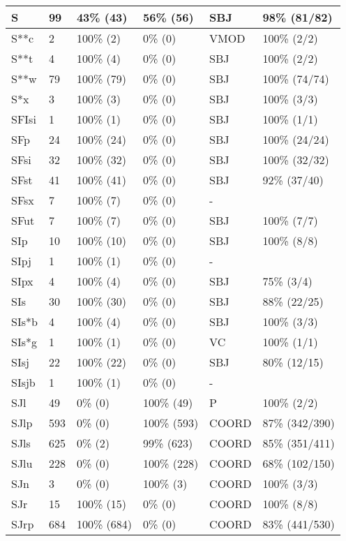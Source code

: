 \begin{figure*}
\begin{tabular}{|l|l|l|l||l|l|}
\hline
 S & 99 & 43\% (43) & 56\% (56) & SBJ & 98\% (81/82) \\ 
\hline
 S**c & 2 & 100\% (2) & 0\% (0) & VMOD & 100\% (2/2) \\ 
\hline
 S**t & 4 & 100\% (4) & 0\% (0) & SBJ & 100\% (2/2) \\ 
\hline
 S**w & 79 & 100\% (79) & 0\% (0) & SBJ & 100\% (74/74) \\ 
\hline
 S*x & 3 & 100\% (3) & 0\% (0) & SBJ & 100\% (3/3) \\ 
\hline
 SFIsi & 1 & 100\% (1) & 0\% (0) & SBJ & 100\% (1/1) \\ 
\hline
 SFp & 24 & 100\% (24) & 0\% (0) & SBJ & 100\% (24/24) \\ 
\hline
 SFsi & 32 & 100\% (32) & 0\% (0) & SBJ & 100\% (32/32) \\ 
\hline
 SFst & 41 & 100\% (41) & 0\% (0) & SBJ & 92\% (37/40) \\ 
\hline
 SFsx & 7 & 100\% (7) & 0\% (0) & - &  \\ 
\hline
 SFut & 7 & 100\% (7) & 0\% (0) & SBJ & 100\% (7/7) \\ 
\hline
 SIp & 10 & 100\% (10) & 0\% (0) & SBJ & 100\% (8/8) \\ 
\hline
 SIpj & 1 & 100\% (1) & 0\% (0) & - &  \\ 
\hline
 SIpx & 4 & 100\% (4) & 0\% (0) & SBJ & 75\% (3/4) \\ 
\hline
 SIs & 30 & 100\% (30) & 0\% (0) & SBJ & 88\% (22/25) \\ 
\hline
 SIs*b & 4 & 100\% (4) & 0\% (0) & SBJ & 100\% (3/3) \\ 
\hline
 SIs*g & 1 & 100\% (1) & 0\% (0) & VC & 100\% (1/1) \\ 
\hline
 SIsj & 22 & 100\% (22) & 0\% (0) & SBJ & 80\% (12/15) \\ 
\hline
 SIsjb & 1 & 100\% (1) & 0\% (0) & - &  \\ 
\hline
 SJl & 49 & 0\% (0) & 100\% (49) & P & 100\% (2/2) \\ 
\hline
 SJlp & 593 & 0\% (0) & 100\% (593) & COORD & 87\% (342/390) \\ 
\hline
 SJls & 625 & 0\% (2) & 99\% (623) & COORD & 85\% (351/411) \\ 
\hline
 SJlu & 228 & 0\% (0) & 100\% (228) & COORD & 68\% (102/150) \\ 
\hline
 SJn & 3 & 0\% (0) & 100\% (3) & COORD & 100\% (3/3) \\ 
\hline
 SJr & 15 & 100\% (15) & 0\% (0) & COORD & 100\% (8/8) \\ 
\hline
 SJrp & 684 & 100\% (684) & 0\% (0) & COORD & 83\% (441/530) \\ 
\hline
\end{tabular}
\end{figure*}
